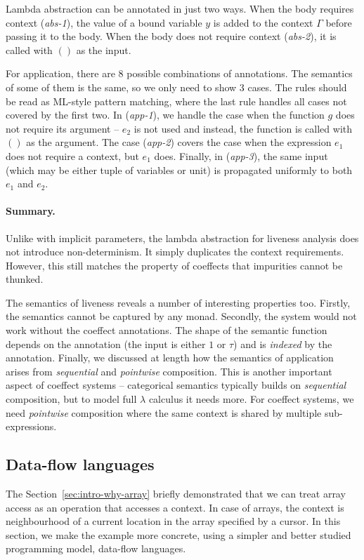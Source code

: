 Lambda abstraction can be annotated in just two ways. When the body requires context (\emph{abs-1}),
the value of a bound variable $y$ is added to the context $\Gamma$ before passing it to the body.
When the body does not require context (\emph{abs-2}), it is called with $()$ as the input.

For application, there are 8 possible combinations of annotations. The semantics of some of them
is the same, so we only need to show 3 cases. The rules should be read as ML-style pattern matching,
where the last rule handles all cases not covered by the first two. In (\emph{app-1}), we handle the
case when the function $g$ does not require its argument -- $e_2$ is not used and instead, the function
is called with $()$ as the argument. The case (\emph{app-2}) covers the case when the expression
$e_1$ does not require a context, but $e_1$ does. Finally, in (\emph{app-3}), the same input
(which may be either tuple of variables or unit) is propagated uniformly to both $e_1$ and $e_2$.

\paragraph{Summary.}
Unlike with implicit parameters, the lambda abstraction for liveness analysis does not introduce 
non-determinism. It simply duplicates the context requirements. However, this still matches the
property of coeffects that impurities cannot be thunked.

The semantics of liveness reveals a number of interesting properties too. Firstly, the semantics
cannot be captured by any monad. Secondly, the system would not work without the coeffect annotations. 
The shape of the semantic function depends on the annotation (the input is either $1$ or $\tau$) and 
is \emph{indexed} by the annotation. Finally, we discussed at length how the semantics of application
arises from \emph{sequential} and \emph{pointwise} composition. This is another important aspect of
coeffect systems -- categorical semantics typically builds on \emph{sequential} composition, but to
model full $\lambda$ calculus it needs more. For coeffect systems, we need \emph{pointwise} composition
where the same context is shared by multiple sub-expressions.


\subsection{Data-flow languages}
The Section~\ref{sec:intro-why-array} briefly demonstrated that we can treat array access as an 
operation that accesses a context. In case of arrays, the context is neighbourhood of a current
location in the array specified by a cursor. In this section, we make the example more concrete,
using a simpler and better studied programming model, data-flow languages.

